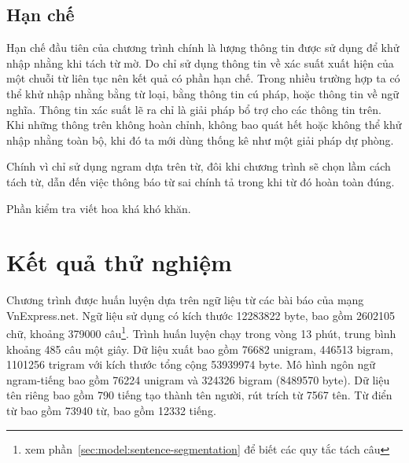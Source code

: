 \documentclass[a4paper,oneside,14pt]{extbook} %
\begin{document}


\subsection{Hạn chế}

Hạn chế đầu tiên của chương trình chính là lượng thông tin được sử
dụng để khử nhập nhằng khi tách từ mờ. Do chỉ sử dụng thông tin về xác
suất xuất hiện của một chuỗi từ liên tục nên kết quả có phần hạn
chế. Trong nhiều trường hợp ta có thể khử nhập nhằng bằng từ loại,
bằng thông tin cú pháp, hoặc thông tin về ngữ nghĩa. Thông tin xác
suất lẽ ra chỉ là giải pháp bổ trợ cho các thông tin trên. Khi những
thông trên không hoàn chỉnh, không bao quát hết hoặc không thể khử
nhập nhằng toàn bộ, khi đó ta mới dùng thống kê như một giải pháp dự
phòng.

Chính vì chỉ sử dụng n\-gram dựa trên từ, đôi khi chương trình sẽ chọn
lầm cách tách từ, dẫn đến việc thông báo từ sai chính tả trong khi từ
đó hoàn toàn đúng. 

Phần kiểm tra viết hoa khá khó khăn.


\section{Kết quả thử nghiệm}

Chương trình được huấn luyện dựa trên ngữ liệu từ các bài báo của mạng
VnExpress.net. Ngữ liệu sử dụng có kích thước 12283822 byte, bao gồm
2602105 chữ, khoảng 379000 
câu\footnote{xem phần~\ref{sec:model:sentence-segmentation}  để biết
  các quy tắc tách câu}. Trình huấn luyện chạy trong vòng 13 phút,
trung bình khoảng 485 câu một giây. Dữ
liệu xuất bao gồm 76682 uni\-gram, 446513 bi\-gram, 1101256 tri\-gram với
kích thước tổng cộng 53939974 byte. Mô
hình ngôn ngữ n\-gram-tiếng bao gồm 76224 uni\-gram và 324326 bi\-gram
(8489570 byte). Dữ
liệu tên riêng bao gồm 790 tiếng tạo thành tên người, rút trích từ
7567 tên. Từ điển từ bao gồm 73940 từ, bao gồm 12332 tiếng.
\end{document}
